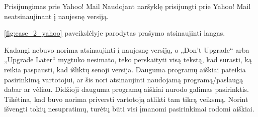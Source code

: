 ﻿\begin{xcase}{Prisijungimas prie Yahoo! Mail}
  \xcgoal
  {
    Naudojant naršyklę prisijungti prie Yahoo! Mail neatsinaujinant į naujesnę versiją.
  }
  \xctools
  {
    \ref{fig:case_2_yahoo} paveikslėlyje parodytas prašymo atsinaujinti langas.

  }
  \xcresult
  {
    Kadangi nebuvo norima atsinaujinti į naujesnę versiją, o „Don't Upgrade“ arba „Upgrade Later“ 
    mygtuko nesimato, teko perskaityti visą tekstą, kad surasti, ką reikia paspausti, kad 
    išliktų senoji versija.
  }
  \xcprinciples
  {
    {
      Dauguma programų aiškiai pateikia pasirinkimą vartotojui, ar šis nori atsinaujinti
      naudojamą programą/paslaugą dabar ar vėliau.
    }
    {
      Didžioji dauguma programų aiškiai nurodo galimas pasirinktis.
    }
  }
  \xcthoughts
  {
    Tikėtina, kad buvo norima priversti vartotoją atlikti tam tikrą veiksmą. Norint išvengti 
    tokių nesupratimų, turėtų būti visi įmanomi pasirinkimai rodomi aiškiai.
  }
\end{xcase}
